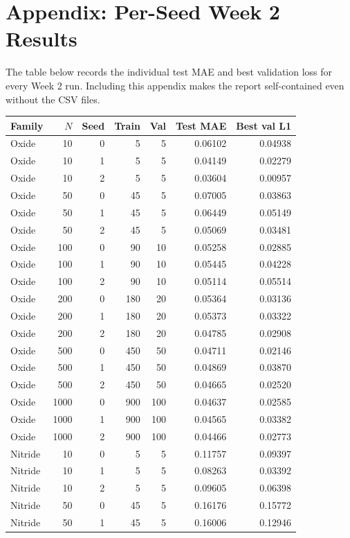 \documentclass[11pt]{article}
\begin{document}
\appendix
\section{Appendix: Per-Seed Week 2 Results}
The table below records the individual test MAE and best validation loss for every Week 2 run.
Including this appendix makes the report self-contained even without the CSV files.

\small
\begin{longtable}{lrrrrrr}
\toprule
Family & $N$ & Seed & Train & Val & Test MAE & Best val L1 \\
\midrule
\endhead
Oxide & 10 & 0 & 5 & 5 & 0.06102 & 0.04938 \\
Oxide & 10 & 1 & 5 & 5 & 0.04149 & 0.02279 \\
Oxide & 10 & 2 & 5 & 5 & 0.03604 & 0.00957 \\
Oxide & 50 & 0 & 45 & 5 & 0.07005 & 0.03863 \\
Oxide & 50 & 1 & 45 & 5 & 0.06449 & 0.05149 \\
Oxide & 50 & 2 & 45 & 5 & 0.05069 & 0.03481 \\
Oxide & 100 & 0 & 90 & 10 & 0.05258 & 0.02885 \\
Oxide & 100 & 1 & 90 & 10 & 0.05445 & 0.04228 \\
Oxide & 100 & 2 & 90 & 10 & 0.05114 & 0.05514 \\
Oxide & 200 & 0 & 180 & 20 & 0.05364 & 0.03136 \\
Oxide & 200 & 1 & 180 & 20 & 0.05373 & 0.03322 \\
Oxide & 200 & 2 & 180 & 20 & 0.04785 & 0.02908 \\
Oxide & 500 & 0 & 450 & 50 & 0.04711 & 0.02146 \\
Oxide & 500 & 1 & 450 & 50 & 0.04869 & 0.03870 \\
Oxide & 500 & 2 & 450 & 50 & 0.04665 & 0.02520 \\
Oxide & 1000 & 0 & 900 & 100 & 0.04637 & 0.02585 \\
Oxide & 1000 & 1 & 900 & 100 & 0.04565 & 0.03382 \\
Oxide & 1000 & 2 & 900 & 100 & 0.04466 & 0.02773 \\
Nitride & 10 & 0 & 5 & 5 & 0.11757 & 0.09397 \\
Nitride & 10 & 1 & 5 & 5 & 0.08263 & 0.03392 \\
Nitride & 10 & 2 & 5 & 5 & 0.09605 & 0.06398 \\
Nitride & 50 & 0 & 45 & 5 & 0.16176 & 0.15772 \\
Nitride & 50 & 1 & 45 & 5 & 0.16006 & 0.12946 \\

\end{longtable}
\end{document}
